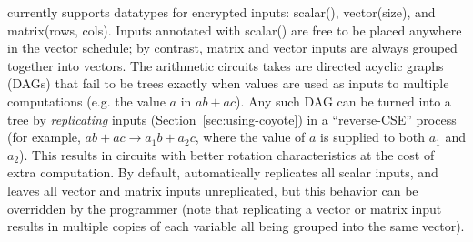 \system currently supports datatypes for encrypted inputs: {\sf scalar()}, {\sf vector(size)}, and {\sf matrix(rows, cols)}.
Inputs annotated with {\sf scalar()} are free to be placed anywhere in the vector schedule; by contrast, {\sf matrix} and {\sf vector} inputs are always grouped together into vectors. %
The arithmetic circuits \system takes are directed acyclic graphs (DAGs) that fail to be trees exactly when values are used as inputs to multiple computations (e.g. the value $a$ in $ab + ac$).
Any such DAG can  be turned into a tree by {\em replicating} inputs (Section~\ref{sec:using-coyote}) in a ``reverse-CSE'' process (for example, $ab + ac \to a_1b + a_2c$, where the value of $a$ is supplied to both $a_1$ and $a_2$).
This results in circuits with better rotation characteristics at the cost of extra computation.
By default, \system automatically replicates all {\sf scalar} inputs, and leaves all {\sf vector} and {\sf matrix} inputs unreplicated, but this behavior can be overridden by the programmer (note that replicating a {\sf vector} or {\sf matrix} input results in multiple copies of each variable all being grouped into the same vector). %

